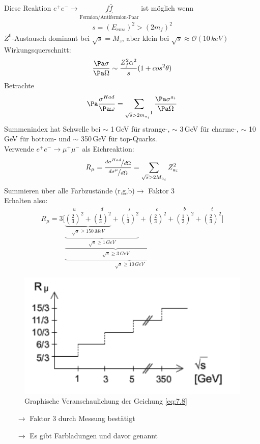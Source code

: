 \begin{itemize}
\begin{itemize}
Diese Reaktion $e^+e^-\rightarrow \underbrace{f\bar{f}}_{\text{Fermion/Antifermion-Paar}}$ ist möglich wenn
\begin{align*}
s=(E_{cms})^2 > (2m_f)^2
\end{align*}
$Z^0$-Austausch dominant bei $\sqrt{s}=M_z$, aber klein bei $\sqrt{s}\approx \mathcal{O}(10\,keV)$\\
Wirkungsquerschnitt:
\begin{align}
\frac{\Pa \sigma}{\Pa \Omega}\sim \frac{Z^2_f\alpha^2}{s} (1+cos^2\theta)
\end{align}
Betrachte
\begin{align}
\Pa\frac{\sigma^{Had}}{\Pa\omega}=\sum_{\sqrt{s}>2m_{a_i}\footnotemark}\frac{\Pa \sigma^{a_i}}{\Pa \Omega}
\end{align}
Summenindex hat Schwelle bei $\sim$ 1\,GeV für strange-, $\sim$ 3\,GeV für charme-, $\sim$ 10\,GeV für bottom- und $\sim$ 350\,GeV für top-Quarks.\\
Verwende $e^+e^-\rightarrow\mu^+\mu^-$ als \grqq Eichreaktion\grqq:
\begin{align}
R_\mu=\frac{\nicefrac{d\sigma^{Had}}{d\Omega}}{\nicefrac{d\sigma^\mu}{d\Omega}}=\sum_{\sqrt{s}>2M_{a_i}}Z^2_{a_i}
\end{align}
Summieren über alle Farbzustände (r,g,b)$\rightarrow$ Faktor 3\\
Erhalten also:
\begin{align}\label{eq:7.8}
R_\mu = 3 \bigg[\underbrace{\underbrace{\underbrace{\underbrace{\stackrel{u}{\left(\frac{2}{3}\right)^2}+\stackrel{d}{\left(\frac{1}{3}\right)^2}}_{\sqrt{s}\geq 150\,MeV}+\stackrel{s}{\left(\frac{1}{3}\right)^2}}_{\sqrt{s}\geq 1\,GeV}+\stackrel{c}{\left(\frac{2}{3}\right)^2}}_{\sqrt{s}\geq 3\,GeV}+\stackrel{b}{\left(\frac{1}{3}\right)^2}}_{\sqrt{s}\geq 10\,GeV}+\stackrel{t}{\left(\frac{2}{3}\right)^2}\bigg]
\end{align}
\begin{figure}[!ht]
\centering
\includegraphics[width=.5\textwidth]{imgs/ep5-fig-7-9.pdf}
\caption{Graphische Veranschaulichung der Geichung \ref{eq:7.8} \label{fig:7.9}}
\end{figure}
\begin{itemize}
\item[$\rightarrow$] Faktor 3 durch Messung bestätigt
\item[$\rightarrow$] Es gibt Farbladungen und davor genannt
\end{itemize}
\end{itemize}
\end{itemize}
